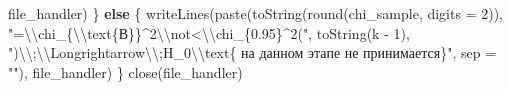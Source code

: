\documentclass[
]{article}
\newenvironment{Shaded}{\begin{snugshade}}{\end{snugshade}}
\newcommand{\AttributeTok}[1]{\textcolor[rgb]{0.77,0.63,0.00}{#1}}
\newcommand{\ControlFlowTok}[1]{\textcolor[rgb]{0.13,0.29,0.53}{\textbf{#1}}}
\newcommand{\DecValTok}[1]{\textcolor[rgb]{0.00,0.00,0.81}{#1}}
\newcommand{\FunctionTok}[1]{\textcolor[rgb]{0.00,0.00,0.00}{#1}}
\newcommand{\NormalTok}[1]{#1}
\newcommand{\SpecialCharTok}[1]{\textcolor[rgb]{0.00,0.00,0.00}{#1}}
\newcommand{\StringTok}[1]{\textcolor[rgb]{0.31,0.60,0.02}{#1}}
\begin{document}
\begin{Shaded}
\begin{Highlighting}[]
\NormalTok{        file\_handler)}
\NormalTok{\} }\ControlFlowTok{else}\NormalTok{ \{}
    \FunctionTok{writeLines}\NormalTok{(}\FunctionTok{paste}\NormalTok{(}\FunctionTok{toString}\NormalTok{(}\FunctionTok{round}\NormalTok{(chi\_sample, }\AttributeTok{digits =} \DecValTok{2}\NormalTok{)), }\StringTok{"=}\SpecialCharTok{\textbackslash{}\textbackslash{}}\StringTok{chi\_\{}\SpecialCharTok{\textbackslash{}\textbackslash{}}\StringTok{text\{В\}\}\^{}2}\SpecialCharTok{\textbackslash{}\textbackslash{}}\StringTok{not\textless{}}\SpecialCharTok{\textbackslash{}\textbackslash{}}\StringTok{chi\_\{0.95\}\^{}2("}\NormalTok{, }
        \FunctionTok{toString}\NormalTok{(k }\SpecialCharTok{{-}} \DecValTok{1}\NormalTok{), }\StringTok{")}\SpecialCharTok{\textbackslash{}\textbackslash{}}\StringTok{;}\SpecialCharTok{\textbackslash{}\textbackslash{}}\StringTok{Longrightarrow}\SpecialCharTok{\textbackslash{}\textbackslash{}}\StringTok{;H\_0}\SpecialCharTok{\textbackslash{}\textbackslash{}}\StringTok{text\{ на данном этапе не принимается\}"}\NormalTok{, }
        \AttributeTok{sep =} \StringTok{""}\NormalTok{), file\_handler)}
\NormalTok{\}}
\FunctionTok{close}\NormalTok{(file\_handler)}
\end{Highlighting}
\end{Shaded}
\end{document}
